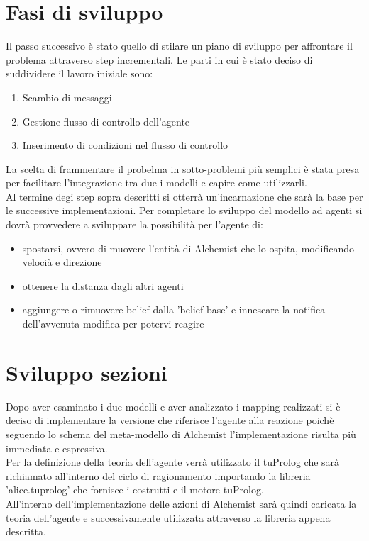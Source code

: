 \documentclass[12pt,a4paper,openright,twoside]{report}
\begin{document}
\section{Fasi di sviluppo}
Il passo successivo \`e stato quello di stilare un piano di sviluppo per affrontare il problema attraverso step incrementali. Le parti in cui \`e stato deciso di suddividere il lavoro iniziale sono:
\begin{enumerate}
   \item Scambio di messaggi
   \item Gestione flusso di controllo dell'agente
   \item Inserimento di condizioni nel flusso di controllo
\end{enumerate}

La scelta di frammentare il probelma in sotto-problemi pi\`u semplici \`e stata presa per facilitare l'integrazione tra due i modelli e capire come utilizzarli.
\\
Al termine degi step sopra descritti si otterr\`a un'incarnazione che sar\`a la base per le successive implementazioni. Per completare lo sviluppo del modello ad agenti si dovr\`a provvedere a sviluppare la possibilit\`a per l'agente di:
\begin{itemize}
   \item spostarsi, ovvero di muovere l'entit\`a di Alchemist che lo ospita, modificando veloci\`a e direzione
   \item ottenere la distanza dagli altri agenti
   \item aggiungere o rimuovere belief dalla 'belief base' e innescare la notifica dell'avvenuta modifica per potervi reagire
\end{itemize}


\section{Sviluppo sezioni}

Dopo aver esaminato i due modelli e aver analizzato i mapping realizzati si \`e deciso di implementare la versione che riferisce l'agente alla reazione poich\`e seguendo lo schema del meta-modello di Alchemist l'implementazione risulta pi\`u immediata e espressiva.
\\
Per la definizione della teoria dell'agente verr\`a utilizzato il tuProlog che sar\`a richiamato all'interno del ciclo di ragionamento importando la libreria 'alice.tuprolog' che fornisce i costrutti e il motore tuProlog.
\\
All'interno dell'implementazione delle azioni di Alchemist sar\`a quindi caricata la teoria dell'agente e successivamente utilizzata attraverso la libreria appena descritta.
\end{document}

